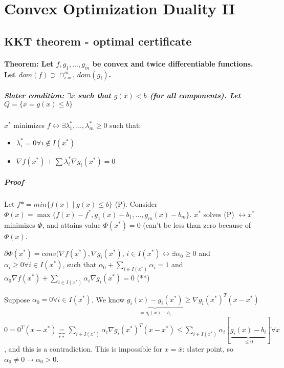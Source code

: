 \documentclass[main]{subfiles}
\begin{document}

\section{Convex Optimization Duality II}
\subsection{KKT theorem - optimal certificate}
\paragraph{Theorem: Let $f, g_{1}, \dots, g_{m}$ be convex and twice
differentiable functions. Let $dom(f) \supset \cap_{i = 1}^{m} dom (g_{i})$.}

\subparagraph{Slater condition: $\exists \bar{x}$ such that $ g( \bar{x} ) < b$
(for all components). Let $Q = \{ x = g(x) \leq b \}$ }

$x^{*}$ minimizes $f \leftrightarrow \exists \lambda^{*}_{1}, \dots,
\lambda^{*}_{m} \geq 0$ such that:
\begin{itemize}
\item $\lambda^{*}_{i} = 0 \forall i \notin I(x^{*})$
\item $\nabla f(x^{*}) + \sum \lambda^{*}_{i} \nabla g_{i}(x^{*}) = 0$
\end{itemize}

\subparagraph{Proof}
Let $f{*} = min \{ f(x) \mid g(x) \leq b \}$ (P). Consider $\Phi (x) = \max
\{ f(x) - f^{*}, g_{1}(x)-b_{1}, \dots, g_{m}(x)-b_{m} \}$. $x^{*}$ solves (P)
$\leftrightarrow x^{*}$ minimizes $\Phi$, and attains value $\Phi (x^{*}) =0$
(can't be less than zero because of $\Phi(x)$.

$\partial \Phi (x^{*}) = conv(\nabla f(x^{*}), \nabla g_{i}(x^{*})$, $i \in
I(x^{*}) \leftrightarrow \exists \alpha_{0} \geq 0$ and $\alpha_{i} \geq 0
\forall i \in I(x^{*})$, such that $\alpha_{0} + \sum_{i \in I(x^{*})}
\alpha_{i} = 1$ and $\alpha_{0} \nabla f(x^{*}) + \sum_{i \in I(x^{*})}
\alpha_{i} \nabla g_{i}(x^{*}) = 0$ (**)

Suppose $\alpha_{0} = 0 \forall i \in I(x^{*})$. We know $\underbrace{g_{i}(x)
- g_{i}(x^{*})}_{= g_{i}(x) -b_{i}} \geq \nabla g_{i}(x^{*})^{T}(x - x^{*})$\\
$0 = 0^{T}(x-x^{*}) \underbrace{=}_{**} \sum_{i \in I(x^{*})} \alpha_{i} \nabla
g_{i}(x^{*})^{T}(x-x^{*}) \leq \sum_{i \in I(x^{*})} \alpha_{i}
[\underbrace{g_{i}(x)-b_{i}}_{\leq 0}] \forall x$, and this is a contradiction.
This is impossible for $x = \bar{x}$: slater point, so $\alpha_{0} \neq 0
\rightarrow \alpha_{0} > 0$.
\end{document}
